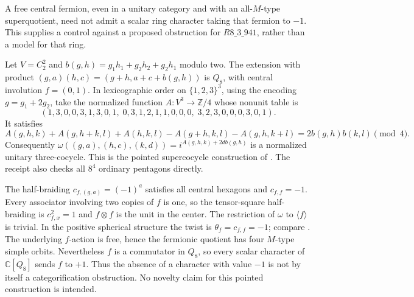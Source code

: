 \begin{example}
\label{ex:frontier-fermion-no-negative-character}
A free central fermion, even in a unitary category and with an all-$M$-type
superquotient, need not admit a scalar ring character taking that fermion
to $-1$.  This supplies a control against a proposed obstruction for
$R8\_3\_941$, rather than a model for that ring.

Let $V=C_2^2$ and
$b(g,h)=g_1h_1+g_2h_2+g_2h_1$ modulo two.  The extension with product
$(g,a)(h,c)=(g+h,a+c+b(g,h))$ is $Q_8$, with central involution
$f=(0,1)$.  In lexicographic order on $\{1,2,3\}^3$, using the encoding
$g=g_1+2g_2$, take the normalized function $A:V^3\to\mathbb Z/4$
whose nonunit table is
\[
 (1,3,0,0,3,1,3,0,1,\;0,3,1,2,1,1,0,0,0,\;3,2,3,0,0,0,3,0,1).
\]
It satisfies
\[
 A(g,h,k)+A(g,h+k,l)+A(h,k,l)
 -A(g+h,k,l)-A(g,h,k+l)=2b(g,h)b(k,l)\pmod4.
\]
Consequently
$\omega((g,a),(h,c),(k,d))=i^{A(g,h,k)+2d b(g,h)}$
is a normalized unitary three-cocycle.  This is the pointed supercocycle
construction of \cite[Theorem~5.4 and Corollary~5.8]{UsherFermionic}.
The receipt also checks all $8^4$ ordinary pentagons directly.

The half-braiding $c_{f,(g,a)}=(-1)^a$ satisfies all central hexagons and
$c_{f,f}=-1$.  Every associator involving two copies of $f$ is one,
so the tensor-square half-braiding is $c_{f,x}^2=1$ and $f\otimes f$
is the unit in the center.  The restriction of $\omega$ to
$\langle f\rangle$ is trivial.  In the positive spherical structure the
twist is $\theta_f=c_{f,f}=-1$; compare
\cite[Section~2.11.5, equation~(26)]{DGNO}.
The underlying $f$-action is free, hence the fermionic quotient has four
$M$-type simple orbits.  Nevertheless $f$ is a commutator in $Q_8$, so
every scalar character of $\mathbb C[Q_8]$ sends $f$ to $+1$.
Thus the absence of a character with value $-1$ is not by itself a
categorification obstruction.  No novelty claim for this pointed
construction is intended.
\end{example}

